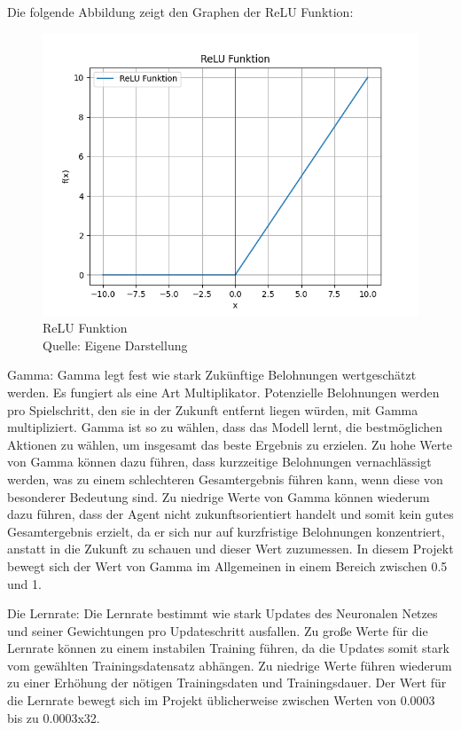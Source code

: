 Die folgende Abbildung zeigt den Graphen der ReLU Funktion:
\nopagebreak
\begin{figure}[H]
	\includegraphics[width=1\textwidth]{Bilder/ReLU} 
	\caption[ReLU Funktion]{ReLU Funktion\\ Quelle: Eigene Darstellung}
\end{figure}

Gamma: Gamma legt fest wie stark Zukünftige Belohnungen wertgeschätzt werden. Es fungiert als eine Art Multiplikator. Potenzielle Belohnungen werden pro Spielschritt, den sie in der Zukunft entfernt liegen würden, mit Gamma multipliziert. Gamma ist so zu wählen, dass das Modell lernt, die bestmöglichen Aktionen zu wählen, um insgesamt das beste Ergebnis zu erzielen. Zu hohe Werte von Gamma können dazu führen, dass kurzzeitige Belohnungen vernachlässigt werden, was zu einem schlechteren Gesamtergebnis führen kann, wenn diese von besonderer Bedeutung sind. Zu niedrige Werte von Gamma können wiederum dazu führen, dass der Agent nicht zukunftsorientiert handelt und somit kein gutes Gesamtergebnis erzielt, da er sich nur auf kurzfristige Belohnungen konzentriert, anstatt in die Zukunft zu schauen und dieser Wert zuzumessen. In diesem Projekt bewegt sich der Wert von Gamma im Allgemeinen in einem Bereich zwischen 0.5 und 1.

Die Lernrate: Die Lernrate bestimmt wie stark Updates des Neuronalen Netzes und seiner Gewichtungen pro Updateschritt ausfallen. Zu große Werte für die Lernrate können zu einem instabilen Training führen, da die Updates somit stark vom gewählten Trainingsdatensatz abhängen. Zu niedrige Werte führen wiederum zu einer Erhöhung der nötigen Trainingsdaten und Trainingsdauer. Der Wert für die Lernrate bewegt sich im Projekt üblicherweise zwischen Werten von 0.0003 bis zu 0.0003x32.

